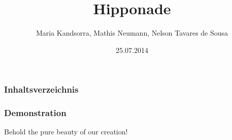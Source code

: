 \documentclass{beamer}
\begin{document}
\title{Hipponade}  
\author{Maria Kandsorra, Mathis Neumann, Nelson Tavares de Sousa}
\date{25.07.2014} 

\begin{frame}
\titlepage
\end{frame} 

\begin{frame}
\frametitle{Inhaltsverzeichnis}\tableofcontents
\end{frame} 











% 
\begin{frame}
\frametitle{Demonstration} 
Behold the pure beauty of our creation!
\end{frame}
\end{document}
